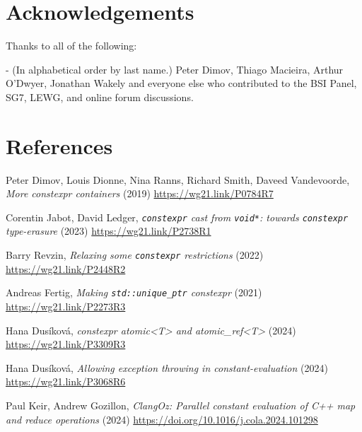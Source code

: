\documentclass[10pt]{article}
\begin{document}


\section{Acknowledgements}

Thanks to all of the following:

  - (In alphabetical order by last name.) Peter Dimov, Thiago Macieira, Arthur O'Dwyer, Jonathan Wakely and everyone else who contributed to the BSI Panel, SG7, LEWG, and online forum discussions.

\section{References}
\renewcommand{\section}[2]{}%
\begin{thebibliography}{9}

    Peter Dimov, Louis Dionne, Nina Ranns, Richard Smith, Daveed Vandevoorde,
    \emph{More constexpr containers} (2019)\newline
    \url{https://wg21.link/P0784R7}

    Corentin Jabot, David Ledger,
    \emph{\texttt{constexpr} cast from \texttt{void*}: towards \texttt{constexpr} type-erasure} (2023)\newline
    \url{https://wg21.link/P2738R1}

    Barry Revzin,
    \emph{Relaxing some \texttt{constexpr} restrictions} (2022)\newline
    \url{https://wg21.link/P2448R2}

    Andreas Fertig,
    \emph{Making \texttt{std::unique\_ptr} constexpr} (2021)\newline
    \url{https://wg21.link/P2273R3}

    Hana Dusíková,
    \emph{constexpr atomic<T> and atomic\_ref<T>} (2024)\newline
    \url{https://wg21.link/P3309R3}

    Hana Dusíková,
    \emph{Allowing exception throwing in constant-evaluation} (2024)\newline
    \url{https://wg21.link/P3068R6}

    Paul Keir, Andrew Gozillon,
    \emph{ClangOz: Parallel constant evaluation of C++ map and reduce operations} (2024)\newline
    \url{https://doi.org/10.1016/j.cola.2024.101298}

\end{thebibliography}
\end{document}
